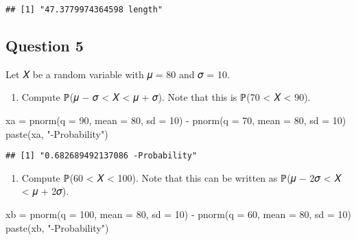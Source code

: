 \documentclass[
]{article}
\newenvironment{Shaded}{\begin{snugshade}}{\end{snugshade}}
\newcommand{\AttributeTok}[1]{\textcolor[rgb]{0.77,0.63,0.00}{#1}}
\newcommand{\DecValTok}[1]{\textcolor[rgb]{0.00,0.00,0.81}{#1}}
\newcommand{\FunctionTok}[1]{\textcolor[rgb]{0.00,0.00,0.00}{#1}}
\newcommand{\NormalTok}[1]{#1}
\newcommand{\OtherTok}[1]{\textcolor[rgb]{0.56,0.35,0.01}{#1}}
\newcommand{\SpecialCharTok}[1]{\textcolor[rgb]{0.00,0.00,0.00}{#1}}
\newcommand{\StringTok}[1]{\textcolor[rgb]{0.31,0.60,0.02}{#1}}
\providecommand{\tightlist}{%
  \setlength{\itemsep}{0pt}\setlength{\parskip}{0pt}}
\begin{document}
\begin{verbatim}
## [1] "47.3779974364598 length"
\end{verbatim}

\hypertarget{question-5}{%
\subsection{Question 5}\label{question-5}}

Let 𝑋 be a random variable with 𝜇 = 80 and 𝜎 = 10.

\begin{enumerate}
\def\labelenumi{\alph{enumi}.}
\tightlist
\item
  Compute ℙ(𝜇 − 𝜎 \textless{} 𝑋 \textless{} 𝜇 + 𝜎). Note that this is
  ℙ(70 \textless{} 𝑋 \textless{} 90).
\end{enumerate}

\begin{Shaded}
\begin{Highlighting}[]
\NormalTok{xa }\OtherTok{=} \FunctionTok{pnorm}\NormalTok{(}\AttributeTok{q =} \DecValTok{90}\NormalTok{, }\AttributeTok{mean =} \DecValTok{80}\NormalTok{, }\AttributeTok{sd =} \DecValTok{10}\NormalTok{) }\SpecialCharTok{{-}} \FunctionTok{pnorm}\NormalTok{(}\AttributeTok{q =} \DecValTok{70}\NormalTok{, }\AttributeTok{mean =} \DecValTok{80}\NormalTok{, }\AttributeTok{sd =} \DecValTok{10}\NormalTok{) }
\FunctionTok{paste}\NormalTok{(xa, }\StringTok{"{-}Probability"}\NormalTok{)  }
\end{Highlighting}
\end{Shaded}

\begin{verbatim}
## [1] "0.682689492137086 -Probability"
\end{verbatim}

\begin{enumerate}
\def\labelenumi{\alph{enumi}.}
\setcounter{enumi}{1}
\tightlist
\item
  Compute ℙ(60 \textless{} 𝑋 \textless{} 100). Note that this can be
  written as ℙ(𝜇 − 2𝜎 \textless{} 𝑋 \textless{} 𝜇 + 2𝜎).
\end{enumerate}

\begin{Shaded}
\begin{Highlighting}[]
\NormalTok{xb }\OtherTok{=} \FunctionTok{pnorm}\NormalTok{(}\AttributeTok{q =} \DecValTok{100}\NormalTok{, }\AttributeTok{mean =} \DecValTok{80}\NormalTok{, }\AttributeTok{sd =} \DecValTok{10}\NormalTok{) }\SpecialCharTok{{-}} \FunctionTok{pnorm}\NormalTok{(}\AttributeTok{q =} \DecValTok{60}\NormalTok{, }\AttributeTok{mean =} \DecValTok{80}\NormalTok{, }\AttributeTok{sd =} \DecValTok{10}\NormalTok{) }
\FunctionTok{paste}\NormalTok{(xb, }\StringTok{"{-}Probability"}\NormalTok{)  }
\end{Highlighting}
\end{Shaded}
\end{document}
